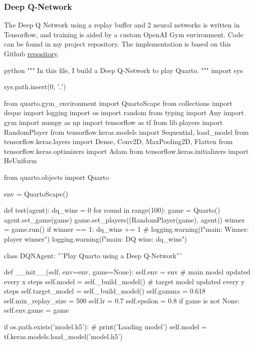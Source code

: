 \subsubsection{Deep Q-Network}

The Deep Q Network using a replay buffer and 2 neural networks is written in Tensorflow, and training is aided by a custom OpenAI Gym environment. Code can be found in my project repository. The implementation is based on this Github \href{https://github.com/mswang12/minDQN/blob/main/minDQN.py}{repository}.

\begin{mintedbox}{python}
"""
In this file, I build a Deep Q-Network to play Quarto.
"""
import sys

sys.path.insert(0, '..')

from quarto.gym_environment import QuartoScape
from collections import deque
import logging
import os
import random
from typing import Any
import gym
import numpy as np
import tensorflow as tf
from lib.players import RandomPlayer
from tensorflow.keras.models import Sequential, load_model
from tensorflow.keras.layers import Dense, Conv2D, MaxPooling2D, Flatten
from tensorflow.keras.optimizers import Adam
from tensorflow.keras.initializers import HeUniform

from quarto.objects import Quarto

env = QuartoScape()


def test(agent):
    dq_wins = 0
    for round in range(100):
        game = Quarto()
        agent.set_game(game)
        game.set_players((RandomPlayer(game), agent))
        winner = game.run()
        if winner == 1:
            dq_wins += 1
        # logging.warning(f"main: Winner: player {winner}")
    logging.warning(f"main: DQ wins: {dq_wins}")


class DQNAgent:
    '''Play Quarto using a Deep Q-Network'''

    def __init__(self, env=env, game=None):
        self.env = env
        # main model updated every x steps
        self.model = self._build_model()
        # target model updated every y steps
        self.target_model = self._build_model()
        self.gamma = 0.618
        self.min_replay_size = 500
        self.lr = 0.7
        self.epsilon = 0.8
        if game is not None:
            self.env.game = game

        if os.path.exists('model.h5'):
            # print('Loading model')
            self.model = tf.keras.models.load_model('model.h5')


\end{mintedbox}
